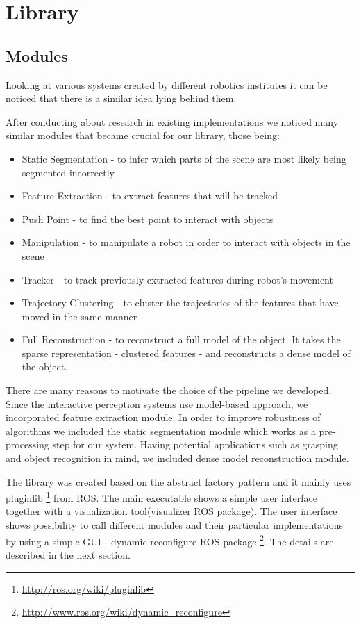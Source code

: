 \section{Library}
\subsection{Modules}
Looking at various systems created by different robotics institutes  it can be noticed that there is a similar idea lying behind them.  

After conducting about research in existing implementations we noticed many similar modules that became crucial for our library, those being:

\begin{itemize}
\item Static Segmentation - to infer which parts of the scene are most likely being segmented incorrectly
\item Feature Extraction - to extract features that will be tracked
\item Push Point - to find the best point to interact with objects
\item Manipulation - to manipulate a robot in order to interact with objects in the scene
\item Tracker - to track previously extracted features during robot's movement
\item Trajectory Clustering - to cluster the trajectories of the features that have moved in the same manner
\item Full Reconstruction - to reconstruct a full model of the object. It takes the sparse representation - clustered features - and reconstructs a dense model of the object.
\end{itemize}

There are many reasons to motivate the choice of the pipeline we developed. Since the interactive perception systems use model-based approach, we incorporated feature extraction module. In order to improve robustness of algorithms we included the static segmentation module which works as a pre-processing step for our system. Having potential applications such as grasping and object recognition in mind, we included dense model reconstruction module.

The library was created based on the abstract factory pattern and it mainly uses pluginlib \footnote{\url{http://ros.org/wiki/pluginlib}} from ROS. The main executable shows a simple user interface together with a visualization tool(visualizer ROS package). The user interface shows possibility to call different modules and their particular implementations by using a simple GUI - dynamic reconfigure ROS package \footnote{\url{http://www.ros.org/wiki/dynamic_reconfigure}}. The details are described in the next section.

